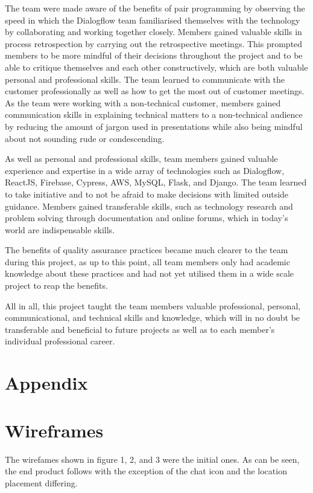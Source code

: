 \documentclass{l3proj}
\begin{document}
The team were made aware of the benefits of pair programming by observing the speed in which the Dialogflow team familiarised themselves with the technology by collaborating and working together closely. Members gained valuable skills in process retrospection by carrying out the retrospective meetings. This prompted members to be more mindful of their decisions throughout the project and to be able to critique themselves and each other constructively, which are both valuable personal and professional skills. The team learned to communicate with the customer professionally as well as how to get the most out of customer meetings. As the team were working with a non-technical customer, members gained communication skills in explaining technical matters to a non-technical audience by reducing the amount of jargon used in presentations while also being mindful about not sounding rude or condescending.

As well as personal and professional skills, team members gained valuable experience and expertise in a wide array of technologies such as Dialogflow, ReactJS, Firebase, Cypress, AWS, MySQL, Flask, and Django. The team learned to take initiative and to not be afraid to make decisions with limited outside guidance. Members gained transferable skills, such as technology research and problem solving through documentation and online forums, which in today's world are indispensable skills.

The benefits of quality assurance practices became much clearer to the team during this project, as up to this point, all team members only had academic knowledge about these practices and had not yet utilised them in a wide scale project to reap the benefits.

All in all, this project taught the team members valuable professional, personal, communicational, and technical skills and knowledge, which will in no doubt be transferable and beneficial to future projects as well as to each member's individual professional career.





\section{Appendix}
\label{appendix}

\appendix
\section{Wireframes}
\label{wireframes}
The wirefames shown in figure 1, 2, and 3 were the initial ones. As can be seen, the end product follows with the exception of the chat icon and the location placement differing.
\end{document}
